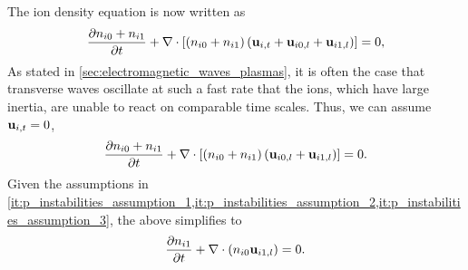 \documentclass[a4paper,11pt]{report}
\begin{document}
The ion density equation is now written as
\begin{equation*}
    \frac{\partial n_{i0} + n_{i1}}{\partial t } + \nabla \cdot \left [ \left ( n_{i0} + n_{i1} \right )\left ( \mathbf{u}_{i,t} + \mathbf{u}_{i0,l} + \mathbf{u}_{i1,l} \right ) \right ] = 0,
\end{equation*}
As stated in \cref{sec:electromagnetic_waves_plasmas}, it is often the case that transverse waves oscillate at such a fast rate that the ions, which have large inertia, are unable to react on comparable time scales. Thus, we can assume $\mathbf{u}_{i,t} = 0$,
\begin{equation*}
    \frac{\partial n_{i0} + n_{i1}}{\partial t } + \nabla \cdot \left [ \left ( n_{i0} + n_{i1} \right )\left ( \mathbf{u}_{i0,l} + \mathbf{u}_{i1,l} \right ) \right ] = 0.
\end{equation*}
Given the assumptions in \cref{it:p_instabilities_assumption_1,it:p_instabilities_assumption_2,it:p_instabilities_assumption_3}, the above simplifies to
\begin{equation}
    \label{eq:p_instabilities_i_den_linearized}
    \frac{\partial n_{i1}}{\partial t } + \nabla \cdot \left ( n_{i0} \mathbf{u}_{i1,l} \right ) = 0.
\end{equation}
\end{document}

